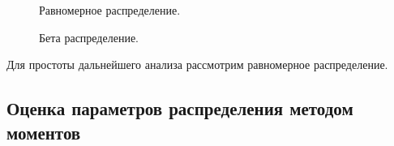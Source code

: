 \documentclass[14pt,a4paper]{scrartcl}
\begin{document}
\begin{figure}[b]
	\caption{Равномерное распределение.}
	\label{ris:fit_unif}
\end{figure}

\begin{figure}[b]
	\caption{Бета распределение.}
	\label{ris:fit_beta}
\end{figure}

Для простоты дальнейшего анализа рассмотрим равномерное распределение.
\pagebreak



\subsection{Оценка параметров распределения методом моментов}
\end{document}
